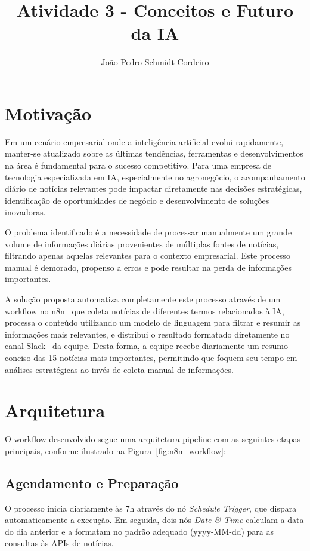 \documentclass{sftex}
\title{Atividade 3 - Conceitos e Futuro da IA}
\author{João Pedro Schmidt Cordeiro}
\begin{document}
\maketitle

\section{Motivação}

Em um cenário empresarial onde a inteligência artificial evolui rapidamente, manter-se atualizado sobre as últimas tendências, ferramentas e desenvolvimentos na área é fundamental para o sucesso competitivo. Para uma empresa de tecnologia especializada em IA, especialmente no agronegócio, o acompanhamento diário de notícias relevantes pode impactar diretamente nas decisões estratégicas, identificação de oportunidades de negócio e desenvolvimento de soluções inovadoras.

O problema identificado é a necessidade de processar manualmente um grande volume de informações diárias provenientes de múltiplas fontes de notícias, filtrando apenas aquelas relevantes para o contexto empresarial. Este processo manual é demorado, propenso a erros e pode resultar na perda de informações importantes.

A solução proposta automatiza completamente este processo através de um workflow no n8n~\cite{n8n_platform} que coleta notícias de diferentes termos relacionados à IA, processa o conteúdo utilizando um modelo de linguagem para filtrar e resumir as informações mais relevantes, e distribui o resultado formatado diretamente no canal Slack~\cite{slack_platform} da equipe. Desta forma, a equipe recebe diariamente um resumo conciso das 15 notícias mais importantes, permitindo que foquem seu tempo em análises estratégicas ao invés de coleta manual de informações.


\section{Arquitetura}

O workflow desenvolvido segue uma arquitetura pipeline com as seguintes etapas principais, conforme ilustrado na Figura~\ref{fig:n8n_workflow}:

\subsection{Agendamento e Preparação}
O processo inicia diariamente às 7h através do nó \textit{Schedule Trigger}, que dispara automaticamente a execução. Em seguida, dois nós \textit{Date \& Time} calculam a data do dia anterior e a formatam no padrão adequado (yyyy-MM-dd) para as consultas às APIs de notícias.
\end{document}
